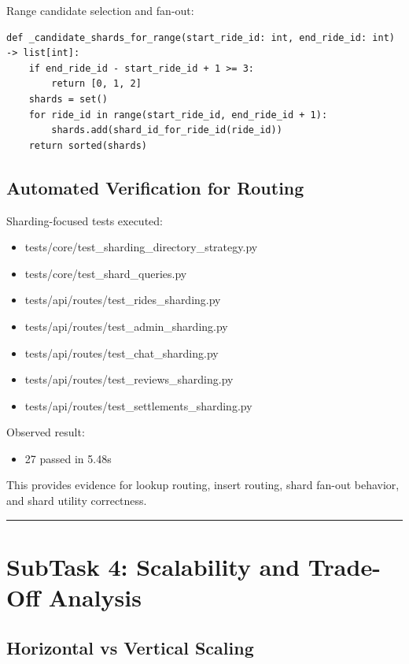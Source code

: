 \documentclass[12pt]{article}
\begin{document}
Range candidate selection and fan-out:

\begin{verbatim}
def _candidate_shards_for_range(start_ride_id: int, end_ride_id: int) -> list[int]:
    if end_ride_id - start_ride_id + 1 >= 3:
        return [0, 1, 2]
    shards = set()
    for ride_id in range(start_ride_id, end_ride_id + 1):
        shards.add(shard_id_for_ride_id(ride_id))
    return sorted(shards)
\end{verbatim}

\subsection{Automated Verification for Routing}

Sharding-focused tests executed:
\begin{itemize}
    \item tests/core/test\_sharding\_directory\_strategy.py
    \item tests/core/test\_shard\_queries.py
    \item tests/api/routes/test\_rides\_sharding.py
    \item tests/api/routes/test\_admin\_sharding.py
    \item tests/api/routes/test\_chat\_sharding.py
    \item tests/api/routes/test\_reviews\_sharding.py
    \item tests/api/routes/test\_settlements\_sharding.py
\end{itemize}

Observed result:
\begin{itemize}
    \item 27 passed in 5.48s
\end{itemize}

This provides evidence for lookup routing, insert routing, shard fan-out behavior, and shard utility correctness.

\hrule
\vspace{0.75em}

\section{SubTask 4: Scalability and Trade-Off Analysis}

\subsection{Horizontal vs Vertical Scaling}
\end{document}
